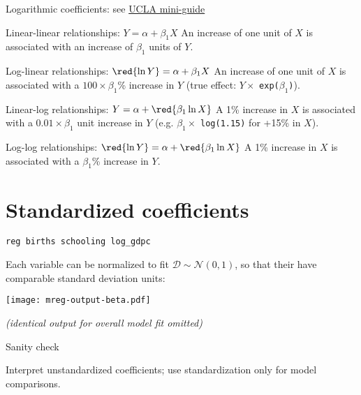 \documentclass[t]{beamer}
\begin{document}
	\begin{frame}[c]{Logarithmic coefficients: see \href{http://www.ats.ucla.edu/stat/mult_pkg/faq/general/log_transformed_regression.htm}{UCLA mini-guide}}
	
		\begin{block}{Linear-linear relationships: $Y = \alpha + \beta_1 X$}
			An increase of one unit of $X$ is associated with an increase of $\beta_1$ units of $Y$.
		\end{block}
	
		\begin{block}{Log-linear relationships: $\red{\ln Y} = \alpha + \beta_1 X$}
			An increase of one unit of $X$ is associated with a $100 \times \beta_1$\% increase in $Y$ (true effect: $Y \times$ \texttt{exp($\beta_1$)}).
		\end{block}

		\begin{block}{Linear-log relationships: $Y = \alpha + \red{\beta_1 \ln X}$}
			A 1\% increase in $X$ is associated with a $0.01 \times \beta_1$ unit increase in $Y$ (e.g. $\beta_1 \times$ \texttt{log(1.15)} for +15\% in $X$).
		\end{block}
	
		\begin{block}{Log-log relationships: $\red{\ln Y} = \alpha + \red{\beta_1 \ln X}$}
			A 1\% increase in $X$ is associated with a $\beta_1$\% increase in $Y$.
		\end{block}
	
	\end{frame}
	
		\section{Standardized coefficients}

	\begin{frame}[t]{\texttt{reg births schooling log\_gdpc}}

		Each variable can be normalized to fit $\mathcal{D} \sim \mathcal{N}(0,1)$, so that their  have comparable standard deviation units:
		
		\texttt{[image: mreg-output-beta.pdf]}

		\footnotesize{\textit{(identical output for overall model fit omitted)}}
		
		\begin{alertblock}{Sanity check}

			Interpret unstandardized coefficients; use standardization only for model comparisons.

		\end{alertblock}

	\end{frame}
\end{document}
